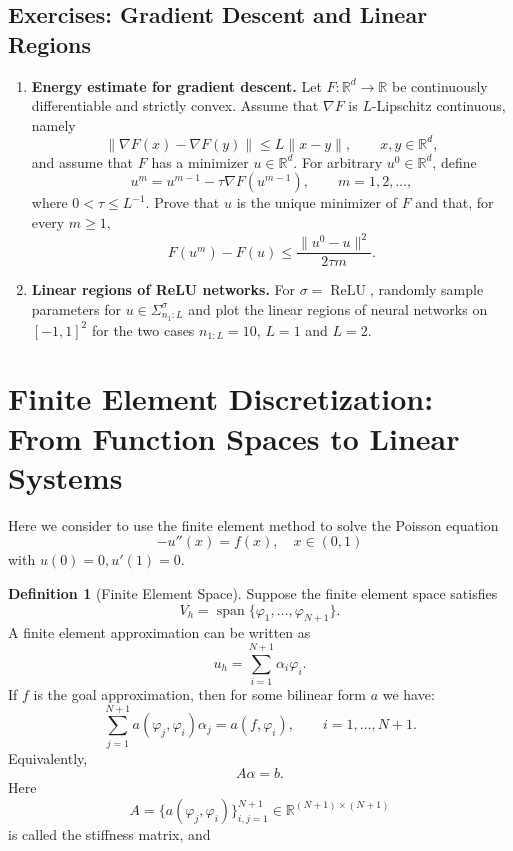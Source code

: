 \documentclass[11pt,a4paper]{article}
\newcommand{\R}{\mathbb{R}}
\newcommand{\ReLU}{\operatorname{ReLU}}
\newcommand{\Span}{\operatorname{span}}
\newcommand{\Vh}{V_h}
\theoremstyle{definition}
\newtheorem{definition}{Definition}[section]
\theoremstyle{plain}
\theoremstyle{remark}
\theoremstyle{plain}
\begin{document}
\subsection*{Exercises: Gradient Descent and Linear Regions}
\begin{enumerate}[label=\textbf{Exercise \arabic*.},leftmargin=2.6em]
  \item \textbf{Energy estimate for gradient descent.}
  Let $F:\mathbb R^d\to\mathbb R$ be continuously differentiable and strictly convex. Assume that $\nabla F$ is $L$-Lipschitz continuous, namely
  \[
    \|\nabla F(x)-\nabla F(y)\|\le L\|x-y\|,\qquad x,y\in\mathbb R^d,
  \]
  and assume that $F$ has a minimizer $u\in\mathbb R^d$. For arbitrary $u^0\in\mathbb R^d$, define
  \[
    u^m=u^{m-1}-\tau \nabla F(u^{m-1}),\qquad m=1,2,\ldots,
  \]
  where $0<\tau\le L^{-1}$. Prove that $u$ is the unique minimizer of $F$ and that, for every $m\ge1$,
  \[
    F(u^m)-F(u)\le \frac{\|u^0-u\|^2}{2\tau m}.
  \]

  \item \textbf{Linear regions of ReLU networks.}
  For $\sigma=\ReLU$, randomly sample parameters for $u\in\Sigma^\sigma_{n_1:L}$ and plot the linear regions of neural networks on $[-1,1]^2$ for the two cases $n_{1:L}=10$, $L=1$ and $L=2$.
\end{enumerate}

\section{Finite Element Discretization: From Function Spaces to Linear Systems}

Here we consider to use the finite element method to solve the Poisson equation
\[
-u''(x)  = f(x), \quad x\in(0,1)
\]
with $u(0) = 0, u'(1) = 0$.
\begin{definition}
    [Finite Element Space]
Suppose the finite element space satisfies
\[
  \Vh=\Span\{\varphi_1,\ldots,\varphi_{N+1}\}.
\]
A finite element approximation can be written as
\[
  u_h=\sum_{i=1}^{N+1}\alpha_i\varphi_i.
\]
If $f$ is the goal approximation, then for some bilinear form $a$ we have:
\[
  \sum_{j=1}^{N+1} a(\varphi_j,\varphi_i)\alpha_j=a(f,\varphi_i),
  \qquad i=1,\ldots,N+1.
\]
Equivalently,
\[
  A\alpha=b.
\]
Here
\[
  A=\{a(\varphi_j,\varphi_i)\}_{i,j=1}^{N+1}
  \in \R^{(N+1)\times(N+1)}
\]
is called the stiffness matrix, and 
\end{definition}
\end{document}
